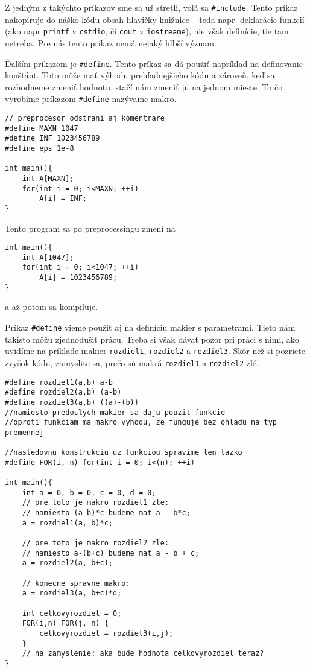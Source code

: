 Z jedným z takýchto príkazov sme sa už stretli, volá sa \verb!#include!. Tento
príkaz nakopíruje do náško kódu obsah hlavičky knižnice -- teda napr.
deklarácie funkcií (ako napr \verb!printf! v \verb!cstdio!, či \verb!cout! v
\verb!iostreame!), nie však definície, tie tam netreba.  Pre nás tento príkaz
nemá nejaký hlbší význam.

Ďalším príkazom je \verb!#define!. Tento príkaz sa dá použiť napríklad na
definovanie konštánt. Toto môže mať výhodu prehľadnejšieho kódu a zároveň, keď
sa rozhodneme zmeniť hodnotu, stačí nám zmeniť ju na jednom mieste. To čo
vyrobíme príkazom \verb!#define!  nazývame makro.

\begin{lstlisting}
// preprocesor odstrani aj komentrare
#define MAXN 1047
#define INF 1023456789
#define eps 1e-8

int main(){
    int A[MAXN]; 
    for(int i = 0; i<MAXN; ++i)
        A[i] = INF;
}
\end{lstlisting}
Tento program sa po preprocessingu zmení na 
\begin{lstlisting}
int main(){
    int A[1047]; 
    for(int i = 0; i<1047; ++i)
        A[i] = 1023456789;
}
\end{lstlisting}
a až potom sa kompiluje.

Príkaz \verb!#define! vieme použiť aj na definíciu makier s parametrami.  Tieto
nám takisto môžu zjednodušiť prácu. Treba si však dávať pozor pri práci s nimi,
ako uvidíme na príklade makier \verb!rozdiel1!, \verb!rozdiel2! a
\verb!rozdiel3!. Skôr než si pozriete zvyšok kódu, zamyslite sa, prečo sú makrá
\verb!rozdiel1! a \verb!rozdiel2! zlé.

\begin{lstlisting}
#define rozdiel1(a,b) a-b
#define rozdiel2(a,b) (a-b)
#define rozdiel3(a,b) ((a)-(b))
//namiesto predoslych makier sa daju pouzit funkcie
//oproti funkciam ma makro vyhodu, ze funguje bez ohladu na typ premennej

//nasledovnu konstrukciu uz funkciou spravime len tazko
#define FOR(i, n) for(int i = 0; i<(n); ++i)

int main(){
    int a = 0, b = 0, c = 0, d = 0;
    // pre toto je makro rozdiel1 zle:
    // namiesto (a-b)*c budeme mat a - b*c;
    a = rozdiel1(a, b)*c;

    // pre toto je makro rozdiel2 zle:
    // namiesto a-(b+c) budeme mat a - b + c;
    a = rozdiel2(a, b+c);

    // konecne spravne makro:
    a = rozdiel3(a, b+c)*d;

    int celkovyrozdiel = 0; 
    FOR(i,n) FOR(j, n) {
        celkovyrozdiel = rozdiel3(i,j);
    }
    // na zamyslenie: aka bude hodnota celkovyrozdiel teraz?
}
\end{lstlisting}

